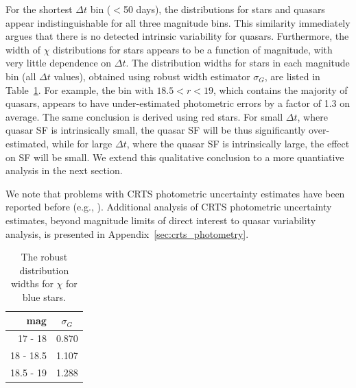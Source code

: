 \documentclass[fleqn,usenatbib]{mnras}
\begin{document}
For the shortest $\Delta t$ bin ($<$50 days), the distributions for stars and quasars appear indistinguishable
for all three magnitude bins. This similarity immediately argues that there is no detected intrinsic variability
for quasars. Furthermore, the width of $\chi$ distributions for stars appears to be a function of magnitude,
with very little dependence on $\Delta t$. The distribution widths for stars in each magnitude bin (all $\Delta t$
values), obtained using robust width estimator $\sigma_G$, are listed in Table~\ref{tab:fc}. For example,
the bin with $18.5<r<19$, which contains the majority of quasars, appears to have under-estimated photometric
errors by a factor of 1.3 on average. The same conclusion is derived using red stars. For small $\Delta t$, where 
quasar SF is intrinsically small, the quasar SF will be thus significantly over-estimated, while for large $\Delta t$, 
where the quasar SF is intrinsically large, the effect on SF will be small. We extend this qualitative conclusion 
to a more quantiative analysis in the next section. 

We note that problems with CRTS photometric uncertainty estimates have been reported before
(e.g., \citealt{vaughan2016}). Additional analysis of CRTS photometric uncertainty estimates, beyond magnitude
limits of direct interest to quasar variability analysis, is presented in Appendix~\ref{sec:crts_photometry}. 

\begin{table}
\centering
\caption{The robust distribution widths for $\chi$ for blue stars.}
\label{tab:fc}
\begin{tabular}{ r|c } 
\hline
 mag    & $\sigma_G$ \\ 
 \hline
17   - 18    & 0.870   \\
18   - 18.5 & 1.107   \\
18.5 - 19   & 1.288   
\end{tabular}
\end{table}
\end{document}
